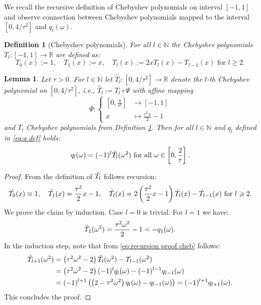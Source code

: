 \documentclass[a4paper,11pt,bibliography=totoc,listof=totoc,headinclude=true,cleardoublepage=empty,oneside]{scrbook}
\newtheorem{definition}[theorem]{Definition}
\newtheorem{lemma}[theorem]{Lemma}
\newcommand{\R}{\mathbb{R}}
\newcommand{\N}{\mathbb{N}}
\begin{document}
We recall the recursive definition of Chebyshev polynomials on interval $[-1, 1]$ \cite[p. 23]{numericsAB} and observe connection between Chebyshev polynomials mapped to the interval $[0, 4/\tau^2]$ and $q_l(\omega)$.

\begin{definition}[Chebyshev polynomials]\label{def:chebyshev polynomials}
    For all $l\in \N$ the Chebyshev polynomials $T_l: [-1, 1] \rightarrow \R$ are defined as:
    \begin{equation*}
        T_0(x) := 1, \quad T_1(x) := x, \quad T_l(x) := 2xT_l(x) - T_{l-1}(x) \text{ for } l \geqslant 2.
    \end{equation*}
\end{definition}

\begin{lemma}\label{lemma:q chebyshev}
    Let $\tau > 0$. For $l\in \N$ let $\hat{T}_l : [0, 4/\tau^2] \rightarrow \R $ denote the $l$-th Chebyshev polynomial on $[0, 4/\tau^2]$, i.e., $\hat{T}_l := T_l \circ \Psi$ with affine mapping 
    \begin{equation*}
        \Psi: \begin{cases}\left[0, \frac{4}{\tau^2}\right] &\rightarrow [-1, 1]\\ x &\mapsto \frac{\tau^2 x}{2} - 1\end{cases}
    \end{equation*}
    and $T_l$ Chebyshev polynomials from Definition \ref{def:chebyshev polynomials}. Then for all $l\in \N$ and $q_l$ defined in \eqref{eq:q def} holds: 
    \begin{equation*}
        q_l(\omega) = (-1)^l \Hat{T_l}(\omega^2) \text{ for all } \omega \in \left[0, \frac{2}{\tau}\right].
    \end{equation*}
\end{lemma}
\begin{proof}
    From the definition of $\Hat{T_l}$ follows recursion:
    \begin{equation}\label{eq:recursion proof cheb}
        \Hat{T_0}(x) \equiv 1, \quad \Hat{T_1}(x) = \frac{\tau^2}{2}x - 1, \quad \Hat{T_l}(x) = 2\left(\frac{\tau^2}{2}x - 1\right)\Hat{T_l}(x) - \Hat{T}_{l-1}(x) \text{ for } l \geqslant 2.
    \end{equation}
    We prove the claim by induction. Case $l=0$ is trivial. For $l=1$ we have:
    \begin{equation*}
        \Hat{T}_1(\omega^2) = \frac{\tau^2\omega^2}{2} - 1 = -q_1(\omega).
    \end{equation*}
    In the induction step, note that from \eqref{eq:recursion proof cheb} follows:
    \begin{align*}
        \Hat{T}_{l+1}(\omega^2) &= \left(\tau^2 \omega^2 -2\right) \Hat{T}_l(\omega^2) - T_{l-1}(\omega^2) \\ &= \left(\tau^2 \omega^2 -2\right) (-1)^l q_l(\omega) - (-1)^{l-1} q_{l-1}(\omega) \\ &= (-1)^{l+1} \left( \left(2-\tau^2\omega^2\right)q_l(\omega) - q_{l-1}(\omega)\right) = (-1)^{l+1} q_{l+1}(\omega).
    \end{align*}
    This concludes the proof.
\end{proof}
\end{document}
